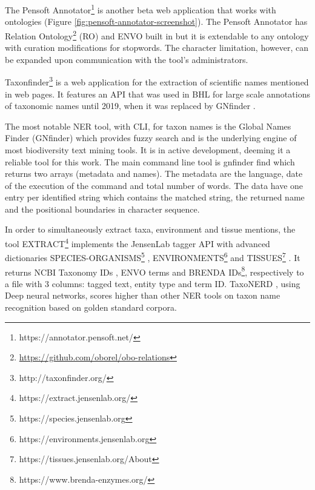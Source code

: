 The Pensoft Annotator\footnote{https://annotator.pensoft.net/} is another beta
web application that works with ontologies \cite{dimitrova_pensoft_2020}
(Figure \ref{fig:pensoft-annotator-screenshot}). The Pensoft Annotator has Relation
Ontology\footnote{\url{https://github.com/oborel/obo-relations}} (RO) and ENVO
built in but it is extendable to any ontology with curation modifications for
stopwords. The character limitation, however, can be expanded upon
communication with the tool’s administrators.

Taxonfinder\footnote{http://taxonfinder.org/} is a web application for the
extraction of scientific names mentioned in web pages. It features an API that
was used in BHL for large scale annotations of taxonomic names until 2019,
when it was replaced by GNfinder \cite{richard_improving_2020}.

The most notable NER tool, with CLI, for taxon names is the Global Names Finder
(GNfinder) \cite{pyle_towards_2016,mozzherin_gnamesgnfinder_2022} which
provides fuzzy search and is the underlying engine of most biodiversity text
mining tools. It is in active development, deeming it a reliable tool for this
work. The main command line tool is gnfinder find which returns two arrays
(metadata and names). The metadata are the language, date of the execution of
the command and total number of words. The data have one entry per identified
string which contains the matched string, the returned name and the positional
boundaries in character sequence.

In order to simultaneously extract taxa, environment and tissue mentions, the
tool EXTRACT\footnote{https://extract.jensenlab.org/} \cite{pafilis_extract_2017}
implements the JensenLab tagger API \cite{jensen2016one} with advanced
dictionaries SPECIES-ORGANISMS\footnote{https://species.jensenlab.org} \cite{pafilis_species_2013},
ENVIRONMENTS\footnote{https://environments.jensenlab.org}
\cite{pafilis_environments_2015} and TISSUES\footnote{https://tissues.jensenlab.org/About}
\cite{palasca_tissues_2018}. It returns NCBI Taxonomy IDs \cite{schoch2020ncbi},
ENVO terms and BRENDA IDs\footnote{https://www.brenda-enzymes.org/},
respectively to a file with 3 columns: tagged text, entity type and term ID.
TaxoNERD \cite{le_guillarme_taxonerd_2022}, using Deep neural networks, scores
higher than other NER tools on taxon name recognition based on golden standard
corpora.

